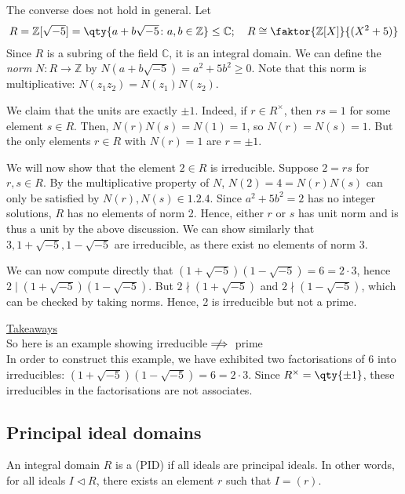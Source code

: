 \begin{example}
	The converse does not hold in general.
	Let
	\begin{align*}
		R = \mathbb Z[\sqrt{-5}] = \qty{a+b\sqrt{-5} \colon a,b \in \mathbb Z} \leq \mathbb C;\quad R \cong \faktor{\mathbb Z[X]}{(X^2 + 5)}
	\end{align*}
	Since $R$ is a subring of the field $\mathbb C$, it is an integral domain.
	We can define the \textit{norm} $N \colon R \to \mathbb Z$ by $N(a+b\sqrt{-5}) = a^2 + 5b^2 \geq 0$.
	Note that this norm is multiplicative: $N(z_1 z_2) = N(z_1) N(z_2)$.

	We claim that the units are exactly $\pm 1$.
	Indeed, if $r \in R^\times$, then $rs = 1$ for some element $s \in R$.
	Then, $N(r) N(s) = N(1) = 1$, so $N(r) = N(s) = 1$.
	But the only elements $r \in R$ with $N(r) = 1$ are $r = \pm 1$.

	We will now show that the element $2 \in R$ is irreducible.
	Suppose $2 = rs$ for $r,s \in R$.
	By the multiplicative property of $N$, $N(2) = 4 = N(r) N(s)$ can only be satisfied by $N(r), N(s) \in \qty{1,2,4}$.
	Since $a^2 + 5b^2 = 2$ has no integer solutions, $R$ has no elements of norm 2.
	Hence, either $r$ or $s$ has unit norm and is thus a unit by the above discussion.
	We can show similarly that $3, 1 + \sqrt{-5}, 1 - \sqrt{-5}$ are irreducible, as there exist no elements of norm 3.

	We can now compute directly that $(1 + \sqrt{-5})(1-\sqrt{-5}) = 6 = 2 \cdot 3$, hence $2 \mid (1 + \sqrt{-5})(1-\sqrt{-5})$.
	But $2 \nmid (1 + \sqrt{-5})$ and $2 \nmid (1 - \sqrt{-5})$, which can be checked by taking norms.
	Hence, 2 is irreducible but not a prime.

	\underline{Takeaways} \\
	So here is an example showing irreducible $\;\not\nobreak\!\!\!\!\implies$ prime \\
	In order to construct this example, we have exhibited two factorisations of 6 into irreducibles: $(1 + \sqrt{-5})(1-\sqrt{-5}) = 6 = 2 \cdot 3$.
	Since $R^\times = \qty{\pm 1}$, these irreducibles in the factorisations are not associates.
\end{example}

\subsection{Principal ideal domains}
\begin{definition}
	An integral domain $R$ is a  (PID) if all ideals are principal ideals.
	In other words, for all ideals $I \triangleleft R$, there exists an element $r$ such that $I = (r)$.
\end{definition}

